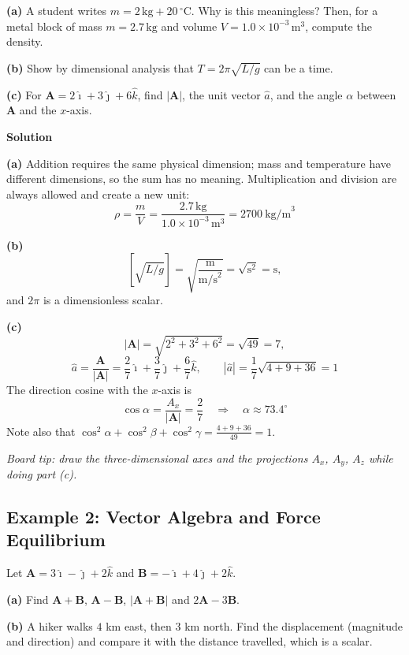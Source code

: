 \documentclass[../main.tex]{subfiles}
\begin{document}
\textbf{(a)} A student writes $m = 2\,\text{kg} + 20\,^\circ\text{C}$. Why is this meaningless? Then, for a metal block of mass $m = 2.7\,\text{kg}$ and volume $V = 1.0\times 10^{-3}\,\text{m}^3$, compute the density.

\textbf{(b)} Show by dimensional analysis that $T = 2\pi\sqrt{L/g}$ can be a time.

\textbf{(c)} For $\mathbf{A} = 2\hat{\imath} + 3\hat{\jmath} + 6\hat{k}$, find $|\mathbf{A}|$, the unit vector $\hat{a}$, and the angle $\alpha$ between $\mathbf{A}$ and the $x$-axis.

\bigskip
\textbf{Solution}

\textbf{(a)} Addition requires the same physical dimension; mass and temperature have different dimensions, so the sum has no meaning. Multiplication and division are always allowed and create a new unit:
\[
\rho = \frac{m}{V} = \frac{2.7\,\text{kg}}{1.0\times 10^{-3}\,\text{m}^3} = 2700\ \text{kg/m}^3
\]

\textbf{(b)}
\[
\left[\sqrt{L/g}\right] = \sqrt{\frac{\text{m}}{\text{m/s}^2}} = \sqrt{\text{s}^2} = \text{s},
\]
and $2\pi$ is a dimensionless scalar.

\textbf{(c)}
\[
|\mathbf{A}| = \sqrt{2^2+3^2+6^2} = \sqrt{49} = 7,
\]
\[
\hat{a} = \frac{\mathbf{A}}{|\mathbf{A}|} = \frac{2}{7}\hat{\imath} + \frac{3}{7}\hat{\jmath} + \frac{6}{7}\hat{k},
\qquad
|\hat{a}| = \frac{1}{7}\sqrt{4+9+36} = 1
\]
The direction cosine with the $x$-axis is
\[
\cos\alpha = \frac{A_x}{|\mathbf{A}|} = \frac{2}{7}
\quad \Longrightarrow \quad \alpha \approx 73.4^\circ
\]
Note also that $\cos^2\alpha + \cos^2\beta + \cos^2\gamma = \frac{4+9+36}{49} = 1$.

\bigskip
\noindent \emph{Board tip: draw the three-dimensional axes and the projections $A_x$, $A_y$, $A_z$ while doing part (c).}


\subsection{Example 2: Vector Algebra and Force Equilibrium}

Let $\mathbf{A} = 3\hat{\imath} - \hat{\jmath} + 2\hat{k}$ and $\mathbf{B} = -\hat{\imath} + 4\hat{\jmath} + 2\hat{k}$.

\textbf{(a)} Find $\mathbf{A}+\mathbf{B}$, $\mathbf{A}-\mathbf{B}$, $|\mathbf{A}+\mathbf{B}|$ and $2\mathbf{A}-3\mathbf{B}$.

\textbf{(b)} A hiker walks $4$ km east, then $3$ km north. Find the displacement (magnitude and direction) and compare it with the distance travelled, which is a scalar.
\end{document}
